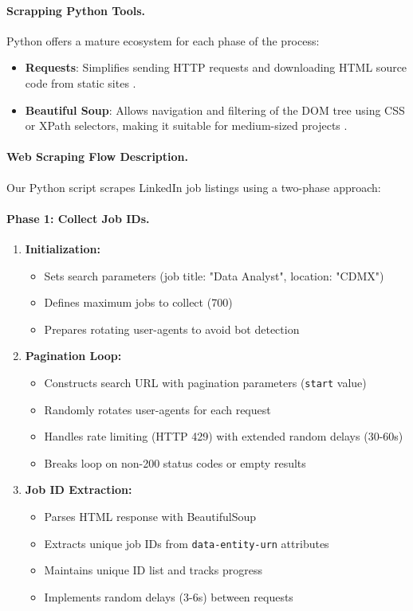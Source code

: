 \documentclass{svproc} %
\begin{document}
	\paragraph{Scrapping Python Tools.}
	Python offers a mature ecosystem for each phase of the process:
	
	\begin{itemize}
		\item \textbf{Requests}: Simplifies sending HTTP requests and downloading HTML source code from static sites \cite{Mitchell2018}.
		\item \textbf{Beautiful Soup}: Allows navigation and filtering of the DOM tree using CSS or XPath selectors, making it suitable for medium-sized projects \cite{Mitchell2018}.
	\end{itemize}
	
	\paragraph{Web Scraping Flow Description.}
	Our Python script scrapes LinkedIn job listings using a two-phase approach:
	
	\paragraph{Phase 1: Collect Job IDs.}
	\begin{enumerate}
		\item \textbf{Initialization:}
		\begin{itemize}
			\item Sets search parameters (job title: "Data Analyst", location: "CDMX")
			\item Defines maximum jobs to collect (700)
			\item Prepares rotating user-agents to avoid bot detection
		\end{itemize}
		
		\item \textbf{Pagination Loop:}
		\begin{itemize}
			\item Constructs search URL with pagination parameters (\texttt{start} value)
			\item Randomly rotates user-agents for each request
			\item Handles rate limiting (HTTP 429) with extended random delays (30-60s)
			\item Breaks loop on non-200 status codes or empty results
		\end{itemize}
		
		\item \textbf{Job ID Extraction:}
		\begin{itemize}
			\item Parses HTML response with BeautifulSoup
			\item Extracts unique job IDs from \texttt{data-entity-urn} attributes
			\item Maintains unique ID list and tracks progress
			\item Implements random delays (3-6s) between requests
		\end{itemize}
	\end{enumerate}
	
\end{document}
